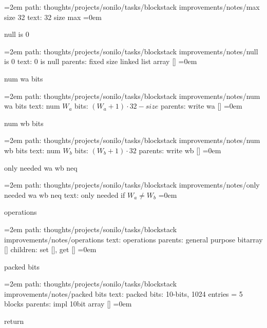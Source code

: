 \par\begingroup
\leftskip=2em
path: thoughts/projects/sonilo/tasks/blockstack improvements/notes/max size 32
\smallskip
text:  32 size max
\smallskip
\leftskip=0em
\par\endgroup
\bigskip
{}
null is 0
\smallskip
\par\begingroup
\leftskip=2em
path: thoughts/projects/sonilo/tasks/blockstack improvements/notes/null is 0
\smallskip
text:  0 is null
\smallskip
parents:  fixed size linked list array []
\smallskip
\leftskip=0em
\par\endgroup
\bigskip
{}
num wa bits
\smallskip
\par\begingroup
\leftskip=2em
path: thoughts/projects/sonilo/tasks/blockstack improvements/notes/num wa bits
\smallskip
text:  num $W_a$ bits: $(W_a + 1)\cdot 32 - size$
\smallskip
parents:  write wa []
\smallskip
\leftskip=0em
\par\endgroup
\bigskip
{}
num wb bits
\smallskip
\par\begingroup
\leftskip=2em
path: thoughts/projects/sonilo/tasks/blockstack improvements/notes/num wb bits
\smallskip
text:  num $W_b$ bits: $(W_b + 1)\cdot 32$
\smallskip
parents:  write wb []
\smallskip
\leftskip=0em
\par\endgroup
\bigskip
{}
only needed wa wb neq
\smallskip
\par\begingroup
\leftskip=2em
path: thoughts/projects/sonilo/tasks/blockstack improvements/notes/only needed wa wb neq
\smallskip
text:  only needed if $W_a \neq W_b$
\smallskip
\leftskip=0em
\par\endgroup
\bigskip
{}
operations
\smallskip
\par\begingroup
\leftskip=2em
path: thoughts/projects/sonilo/tasks/blockstack improvements/notes/operations
\smallskip
text:  operations
\smallskip
parents:  general purpose bitarray []
\smallskip
children: set [], get []
\smallskip
\leftskip=0em
\par\endgroup
\bigskip
{}
packed bits
\smallskip
\par\begingroup
\leftskip=2em
path: thoughts/projects/sonilo/tasks/blockstack improvements/notes/packed bits
\smallskip
text:  packed bits: 10-bits, 1024 entries = 5 blocks
\smallskip
parents:  impl 10bit array []
\smallskip
\leftskip=0em
\par\endgroup
\bigskip
{}
return
\smallskip
\par\begingroup
